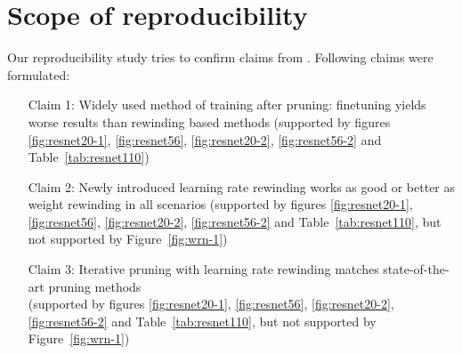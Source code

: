 
\section{Scope of reproducibility}
\label{sec:claims}



Our reproducibility study tries to confirm claims from \cite{Renda}.
Following claims were formulated:
\begin{itemize}
    \item [Claim 1:] Widely used method of training after pruning: finetuning yields worse results than rewinding based methods (supported by figures \ref{fig:resnet20-1}, \ref{fig:resnet56}, \ref{fig:resnet20-2}, \ref{fig:resnet56-2} and Table~\ref{tab:resnet110})
    \item [Claim 2:] Newly introduced learning rate rewinding works as good or better as weight rewinding in all scenarios (supported by figures \ref{fig:resnet20-1}, \ref{fig:resnet56}, \ref{fig:resnet20-2}, \ref{fig:resnet56-2} and Table~\ref{tab:resnet110}, but not supported by Figure~\ref{fig:wrn-1})
    \item [Claim 3:] Iterative pruning with learning rate rewinding matches state-of-the-art pruning methods \\(supported by figures \ref{fig:resnet20-1}, \ref{fig:resnet56}, \ref{fig:resnet20-2}, \ref{fig:resnet56-2} and Table~\ref{tab:resnet110}, but not supported by Figure~\ref{fig:wrn-1})
\end{itemize}

